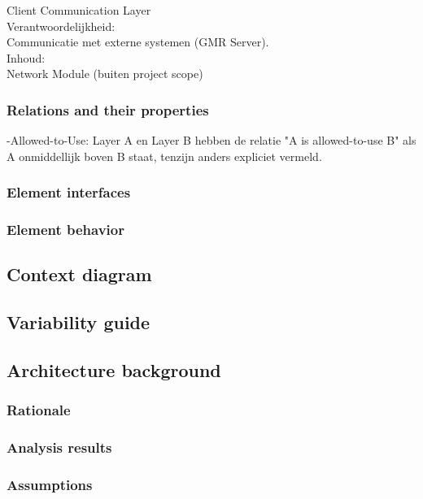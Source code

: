 \documentclass[a4paper,10pt]{article}
\begin{document}
Client Communication Layer\\

Verantwoordelijkheid:\\
Communicatie met externe systemen (GMR Server).\\

Inhoud:\\
Network Module (buiten project scope)\\


\subsubsection{Relations and their properties}

-Allowed-to-Use: Layer A en Layer B hebben de relatie "A is allowed-to-use B" als A onmiddellijk boven B staat, tenzijn anders expliciet vermeld.\\

\subsubsection{Element interfaces}

\subsubsection{Element behavior}

\subsection{Context diagram}

\subsection{Variability guide}

\subsection{Architecture background}

\subsubsection{Rationale}

\subsubsection{Analysis results}

\subsubsection{Assumptions}
\end{document}
